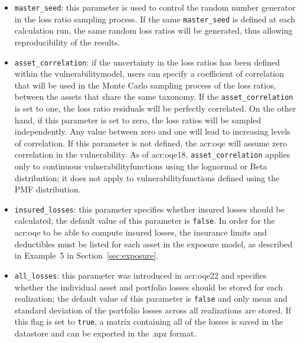 \begin{itemize}

  \item \Verb+master_seed+: this parameter is used to control the random
    number generator in the loss ratio sampling process. If the same
    \Verb+master_seed+ is defined at each calculation run, the same random loss
    ratios will be generated, thus allowing reproducibility of the results.

  \item \Verb+asset_correlation+: if the uncertainty in the loss ratios
    has been defined within the \gls{vulnerabilitymodel}, users can specify
    a coefficient of correlation that will be used in the Monte Carlo sampling
    process of the loss ratios, between the assets that share the same
    \gls{taxonomy}. If the \Verb+asset_correlation+ is set to one,
    the loss ratio residuals will be perfectly correlated. On the other hand,
    if this parameter is set to zero, the loss ratios will be sampled
    independently. Any value between zero and one will lead to increasing
    levels of correlation. If this parameter is not defined, the
    \glsdesc{acr:oqe} will assume zero correlation in the vulnerability. As of
    \glsdesc{acr:oqe18}, \Verb+asset_correlation+ applies only to continuous
    \glspl{vulnerabilityfunction} using the lognormal or Beta distribution; 
    it does not apply to \glspl{vulnerabilityfunction} defined using the PMF
    distribution.

  \item \Verb+insured_losses+: this parameter specifies whether insured losses
    should be calculated; the default value of this parameter is \Verb+false+.
    In order for the \glsdesc{acr:oqe} to be able to compute insured losses, the
    insurance limits and deductibles must be listed for each asset in the 
    exposure model, as described in Example~5 in Section~\ref{sec:exposure}.

  \item \Verb+all_losses+: this parameter was introduced in \glsdesc{acr:oqe22}
    and specifies whether the individual asset and portfolio losses should be
    stored for each realization; the default value of this parameter is
    \Verb+false+ and only mean and standard deviation of the portfolio losses
    across all realizations are stored. If this flag is set to \Verb+true+, a
    matrix containing all of the losses is saved in the datastore and can be
    exported in the .npz format.

\end{itemize}

